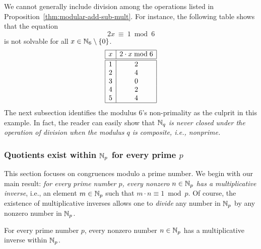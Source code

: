 We cannot generally include division among the operations listed in Proposition~\ref{thm:modular-add-sub-mult}.  For instance, the following table shows that the equation 
\[ 2x \ \equiv \ 1 \bmod 6 \]
is not solvable for all $x \in \mathbb{N}_6 \setminus \{0\}$.
\[ \begin{array}{|c|c|}
\hline
x & 2 \cdot x \bmod 6 \\
\hline
\hline
1 & 2 \\
2 & 4 \\
3 & 0 \\
4 & 2 \\
5 & 4 \\
\hline
\end{array}
\]
The next subsection identifies the modulus $6$'s non-primality as the culprit in this example.  In fact, the reader can easily show that {\em $\mathbb{N}_q$ is never closed under the operation of division when the modulus $q$ is composite, i.e., nonprime.}


\subsubsection{Quotients exist within $\mathbb{N}_p$ for every prime $p$}
\label{sec:modular-quotientss}

This section focuses on congruences modulo a prime number.  We begin with our main result: {\em for every prime number $p$, every nonzero $n \in \mathbb{N}_p$ has a {\em multiplicative inverse}}, i.e., an element $m \in \mathbb{N}_p$ such that $m \cdot n \equiv 1 \bmod p$.  Of course, the existence of
multiplicative inverses allows one to {\em divide} any number in $\mathbb{N}_p$ by any nonzero number in $\mathbb{N}_p$.

\begin{prop}
\label{thm:finite-field}
For every prime number $p$, every nonzero number $n \in \mathbb{N}_p$ has a multiplicative inverse within $\mathbb{N}_p$.
\end{prop}

